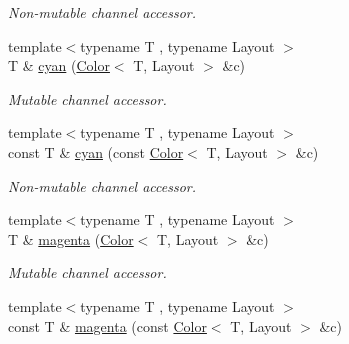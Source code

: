 \begin{DoxyCompactItemize}
\begin{DoxyCompactList}\small\item\em Non-\/mutable channel accessor. \end{DoxyCompactList}\item 
\hypertarget{group___channel_accessors_ga47dfa2b4967e6d59132775b062f770be}{{\footnotesize template$<$typename T , typename Layout $>$ }\\T \& \hyperlink{group___channel_accessors_ga47dfa2b4967e6d59132775b062f770be}{cyan} (\hyperlink{class_d_o_1_1_color}{Color}$<$ T, Layout $>$ \&c)}\label{group___channel_accessors_ga47dfa2b4967e6d59132775b062f770be}

\begin{DoxyCompactList}\small\item\em Mutable channel accessor. \end{DoxyCompactList}\item 
\hypertarget{group___channel_accessors_gaae689fe2a49dafa645bed231415281be}{{\footnotesize template$<$typename T , typename Layout $>$ }\\const T \& \hyperlink{group___channel_accessors_gaae689fe2a49dafa645bed231415281be}{cyan} (const \hyperlink{class_d_o_1_1_color}{Color}$<$ T, Layout $>$ \&c)}\label{group___channel_accessors_gaae689fe2a49dafa645bed231415281be}

\begin{DoxyCompactList}\small\item\em Non-\/mutable channel accessor. \end{DoxyCompactList}\item 
\hypertarget{group___channel_accessors_gad0c36c945f72154bacb9dd3339da3eb8}{{\footnotesize template$<$typename T , typename Layout $>$ }\\T \& \hyperlink{group___channel_accessors_gad0c36c945f72154bacb9dd3339da3eb8}{magenta} (\hyperlink{class_d_o_1_1_color}{Color}$<$ T, Layout $>$ \&c)}\label{group___channel_accessors_gad0c36c945f72154bacb9dd3339da3eb8}

\begin{DoxyCompactList}\small\item\em Mutable channel accessor. \end{DoxyCompactList}\item 
\hypertarget{group___channel_accessors_ga012dc44d2b56f5688643a355f0737daa}{{\footnotesize template$<$typename T , typename Layout $>$ }\\const T \& \hyperlink{group___channel_accessors_ga012dc44d2b56f5688643a355f0737daa}{magenta} (const \hyperlink{class_d_o_1_1_color}{Color}$<$ T, Layout $>$ \&c)}\label{group___channel_accessors_ga012dc44d2b56f5688643a355f0737daa}


\end{DoxyCompactItemize}
